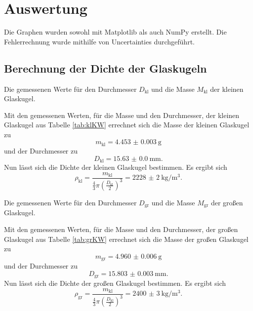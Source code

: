 \section{Auswertung}
\label{sec:Auswertung}

Die Graphen wurden sowohl mit Matplotlib \cite{matplotlib} als auch NumPy \cite{numpy} erstellt. Die
 Fehlerrechnung wurde mithilfe von Uncertainties \cite{uncertainties} durchgeführt.



\subsection{Berechnung der Dichte der Glaskugeln}
\begin{table}
	\centering
	\caption{Die gemessenen Werte für den Durchmesser $D_\text{kl}$ und die Masse $M_\text{kl}$ der kleinen Glaskugel.}
	
\end{table}
Mit den gemessenen Werten, für die Masse und den Durchmesser, der kleinen Glaskugel aus Tabelle \ref{tab:klKW} errechnet sich die Masse der kleinen Glaskugel zu
\begin{displaymath}
	m_\text{kl} = \SI{4.453(3)}{\gram}
\end{displaymath}
und der Durchmesser zu
\begin{displaymath}
	D_\text{kl} = \SI{15.63(0)}{\milli\meter}\text{.}
\end{displaymath}
Nun lässt sich die Dichte der kleinen Glaskugel bestimmen. Es ergibt sich
\begin{displaymath}
	\rho_\text{kl} = \frac{m_\text{kl}}{\frac{4}{3}\pi \left(\frac{D_\text{kl}}{2}\right)^3} = \SI{2228(2)}{\kilo\gram\per\meter\tothe{3}}\text{.}
\end{displaymath}
\begin{table}
	\centering
	\caption{Die gemessenen Werte für den Durchmesser $D_\text{gr}$ und die Masse $M_\text{gr}$ der großen Glaskugel.}
	
\end{table}
Mit den gemessenen Werten, für die Masse und den Durchmesser, der großen Glaskugel aus Tabelle \ref{tab:grKW} errechnet sich die Masse der großen Glaskugel zu
\begin{displaymath}
m_\text{gr} = \SI{4.960(6)}{\gram}
\end{displaymath}
und der Durchmesser zu
\begin{displaymath}
D_\text{gr} = \SI{15.803(3)}{\milli\meter}\text{.}
\end{displaymath}
Nun lässt sich die Dichte der großen Glaskugel bestimmen. Es ergibt sich
\begin{displaymath}
\rho_\text{gr} = \frac{m_\text{kl}}{\frac{4}{3}\pi \left(\frac{D_\text{kl}}{2}\right)^3} = \SI{2400(3)}{\kilo\gram\per\meter\tothe{3}}\text{.}
\end{displaymath}




